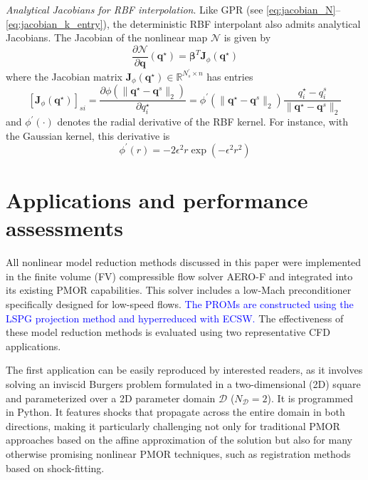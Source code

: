 \documentclass[preprint,10pt]{elsarticle}
\begin{document}
\emph{Analytical Jacobians for RBF interpolation}. Like GPR (see \eqref{eq:jacobian_N}--\eqref{eq:jacobian_k_entry}), the deterministic RBF interpolant also admits analytical 
Jacobians. The Jacobian of the nonlinear map $\mathcal{N}$ is given by
\begin{equation*}
	\frac{\partial \mathcal{N}}{\partial \mathbf{q}}(\mathbf{q}^\star) = \boldsymbol{\beta}^T \mathbf{J}_\phi(\mathbf{q}^\star)
\end{equation*}
where the Jacobian matrix $\mathbf{J}_\phi(\mathbf{q}^\star) \in \mathbb{R}^{N_s^\prime \times n}$ has entries
\begin{equation*}
	\left[\mathbf{J}_\phi(\mathbf{q}^\star)\right]_{si} = \frac{\partial \phi(\|\mathbf{q}^\star - \mathbf{q}^s\|_2)}{\partial q_i^\star} = \phi^\prime (\|\mathbf{q}^\star - 
	\mathbf{q}^s\|_2) \frac{q_i^\star - q_i^s}{\|\mathbf{q}^\star - \mathbf{q}^s\|_2}
\end{equation*}
and $\phi^\prime(\cdot)$ denotes the radial derivative of the RBF kernel. For instance, with the Gaussian kernel, this derivative is
\begin{equation*}
	\phi^\prime(r) = -2 \epsilon^2 r \exp(-\epsilon^2 r^2)
\end{equation*}

\section{Applications and performance assessments}
\label{sec:Apps}

All nonlinear model reduction methods discussed in this paper were implemented in the finite volume (FV) compressible flow solver AERO-F \cite{farhat2003application} and integrated 
into its existing PMOR capabilities. This solver includes a low-Mach preconditioner \cite{turkel1999preconditioning} specifically designed for low-speed flows. \textcolor{blue}{The PROMs are constructed using the LSPG projection method and hyperreduced with ECSW.} The effectiveness of these model reduction methods is evaluated using two representative CFD applications.

The first application can be easily reproduced by interested readers, as it involves solving an inviscid Burgers problem formulated in a two-dimensional (2D) square and parameterized over a 2D parameter domain $\mathcal{D}$ ($N_\mathcal{D} = 2$). It is programmed in Python. It features shocks that propagate across the entire domain in both directions, making it particularly challenging not only for traditional PMOR approaches based on the affine approximation of the solution but also for many otherwise promising nonlinear PMOR techniques, such as registration methods based on shock-fitting. 
\end{document}
